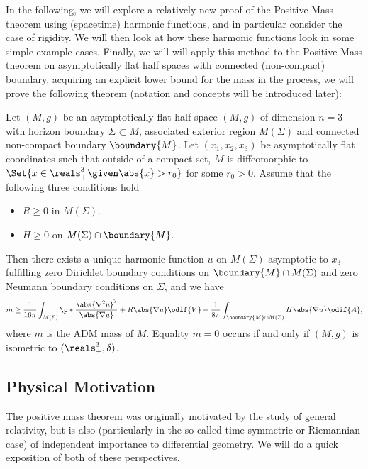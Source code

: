 \documentclass[titlepage,numbers=noenddot,headinclude,oneside,%
footinclude=true,cleardoublepage=empty,%
BCOR=5mm,paper=a4,fontsize=11pt,%
english,%
]{scrartcl}
\begin{document}
In the following, we will explore a relatively new proof of the Positive Mass theorem using (spacetime) harmonic functions, and in particular consider the case of rigidity. We will then look at how these harmonic functions look in some simple example cases. Finally, we will will apply this method to the Positive Mass theorem on asymptotically flat half spaces with connected (non-compact) boundary, acquiring an explicit lower bound for the mass in the process, \ie we will prove the following theorem (notation and concepts will be introduced later):

\begin{theorem}
    Let \( (M,g) \) be an asymptotically flat half-space \( (M,g) \) of dimension \( n=3 \) with horizon boundary \( \Sigma\subset M \), associated exterior region \( M(\Sigma) \) and connected non-compact boundary \( \boundary{M} \). Let \( (x_1,x_2,x_3) \) be asymptotically flat coordinates such that outside of a compact set, \( M \) is diffeomorphic to \( \Set{x\in \reals^3_+\given \abs{x}>r_0} \) for some \( r_0>0 \). Assume that the following three conditions hold
    \begin{itemize}
        \item \( R\geq 0 \) in \( M(\Sigma) \).
        \item \( H \geq 0 \) on \( M(\Sigma)\cap \boundary{M} \).
    \end{itemize}
    Then there exists a unique harmonic function \( u \) on \( M(\Sigma) \) asymptotic to \( x_3 \) fulfilling zero Dirichlet boundary conditions on \( \boundary{M}\cap M(\Sigma) \) and zero Neumann boundary conditions on \( \Sigma \), and we have
    \begin{equation*}
        m\geq \frac{1}{16\pi}\int_{M(\Sigma)}\p*{\frac{\abs{\nabla^2 u}^2}{\abs{\nabla u}}+R\abs{\nabla u}}\odif{V}+\frac{1}{8\pi}\int_{\boundary{M}\cap M(\Sigma)}H\abs{\nabla u}\odif{A},
    \end{equation*}
    where \( m \) is the ADM mass of \( M \). Equality \( m=0 \) occurs if and only if \( (M,g) \) is isometric to \( (\reals^3_+,\delta) \). 
\end{theorem}
\subsection{Physical Motivation}
The positive mass theorem was originally motivated by the study of general relativity, but is also (particularly in the so-called time-symmetric or Riemannian case) of independent importance to differential geometry. We will do a quick exposition of both of these perspectives.
\end{document}
